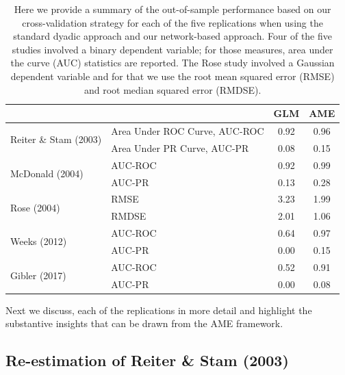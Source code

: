 \begin{table}[ht]
\centering
	\begin{tabular}{l|l cc}
	~ & ~ & GLM & AME \\
	\toprule
\multirow{2}{*}{Reiter \& Stam (2003)} & Area Under ROC Curve, AUC-ROC & 0.92 & {0.96} \\
		~ & Area Under PR Curve, AUC-PR & 0.08 &  {0.15} \\		\midrule
\multirow{2}{*}{McDonald (2004)} & AUC-ROC & 0.92 &  {0.99} \\
		~ & AUC-PR & 0.13 &  {0.28} \\		\midrule
\multirow{2}{*}{Rose (2004)} & RMSE & 3.23 &  {1.99} \\
		~ & RMDSE & 2.01 &  {1.06} \\	\midrule
\multirow{2}{*}{Weeks (2012)} & AUC-ROC & 0.64 &  {0.97} \\
		~ & AUC-PR & 0.00 &  {0.15} \\		\midrule
\multirow{2}{*}{Gibler (2017)} & AUC-ROC & 0.52 &  {0.91} \\
		~ & AUC-PR & 0.00 &  {0.08} \\			\bottomrule
	\end{tabular}
	\caption{Here we provide a summary of the out-of-sample performance based on our cross-validation strategy for each of the five replications when using the standard dyadic approach and our network-based approach. Four of the five studies involved a binary dependent variable; for those measures, area under the curve (AUC) statistics are reported. The Rose study involved a Gaussian dependent variable and for that we use the root mean squared error (RMSE) and root median squared error (RMDSE). 
	}
	\label{tab:modelPerfSumm}
\end{table}
\FloatBarrier

Next we discuss, each of the replications in more detail and highlight the substantive insights that can be drawn from the AME framework.

\subsection{Re-estimation of Reiter \& Stam (2003)}


